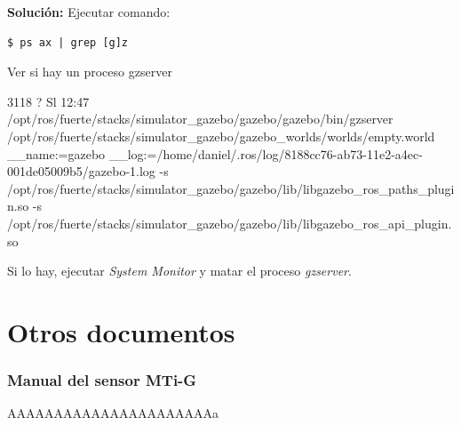 \documentclass[10pt, a4paper]{report}
\begin{document}
\textbf{Solución: }
Ejecutar comando:
\begin{verbatim}
$ ps ax | grep [g]z
\end{verbatim}

Ver si hay un proceso gzserver

\begin{spverbatim}
 3118 ?        Sl    12:47
 /opt/ros/fuerte/stacks/simulator_gazebo/gazebo/gazebo/bin/gzserver 
 /opt/ros/fuerte/stacks/simulator_gazebo/gazebo_worlds/worlds/empty.world __name:=gazebo __log:=/home/daniel/.ros/log/8188cc76-ab73-11e2-a4ec-001de05009b5/gazebo-1.log -s /opt/ros/fuerte/stacks/simulator_gazebo/gazebo/lib/libgazebo_ros_paths_plugin.so -s /opt/ros/fuerte/stacks/simulator_gazebo/gazebo/lib/libgazebo_ros_api_plugin.so
\end{spverbatim}

Si lo hay, ejecutar \textit{System Monitor} y matar el proceso \textit{gzserver}.

\part{Otros documentos}

\section{Manual del sensor MTi-G}

%
AAAAAAAAAAAAAAAAAAAAAAa
\end{document}
